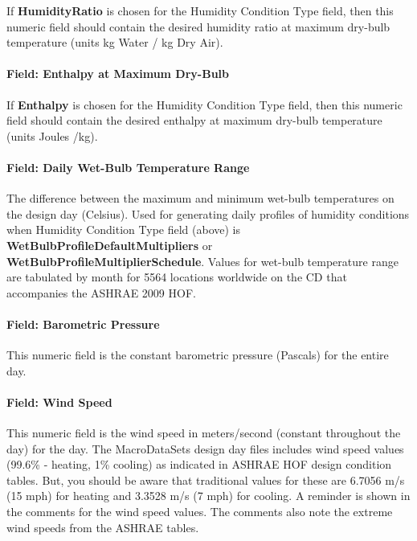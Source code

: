 If \textbf{HumidityRatio} is chosen for the Humidity Condition Type field, then this numeric field should contain the desired humidity ratio at maximum dry-bulb temperature (units kg Water / kg Dry Air).

\paragraph{Field: Enthalpy at Maximum Dry-Bulb}\label{field-enthalpy-at-maximum-dry-bulb}

If \textbf{Enthalpy} is chosen for the Humidity Condition Type field, then this numeric field should contain the desired enthalpy at maximum dry-bulb temperature (units Joules /kg).

\paragraph{Field: Daily Wet-Bulb Temperature Range}\label{field-daily-wet-bulb-temperature-range}

The difference between the maximum and minimum wet-bulb temperatures on the design day (Celsius). Used for generating daily profiles of humidity conditions when Humidity Condition Type field (above) is \textbf{WetBulbProfileDefaultMultipliers} or \textbf{WetBulbProfileMultiplierSchedule}. Values for wet-bulb temperature range are tabulated by month for 5564 locations worldwide on the CD that accompanies the ASHRAE 2009 HOF.

\paragraph{Field: Barometric Pressure}\label{field-barometric-pressure}

This numeric field is the constant barometric pressure (Pascals) for the entire day.

\paragraph{Field: Wind Speed}\label{field-wind-speed}

This numeric field is the wind speed in meters/second (constant throughout the day) for the day. The MacroDataSets design day files includes wind speed values (99.6\% - heating, 1\% cooling) as indicated in ASHRAE HOF design condition tables. But, you should be aware that traditional values for these are 6.7056 m/s (15 mph) for heating and 3.3528 m/s (7 mph) for cooling. A reminder is shown in the comments for the wind speed values. The comments also note the extreme wind speeds from the ASHRAE tables.

